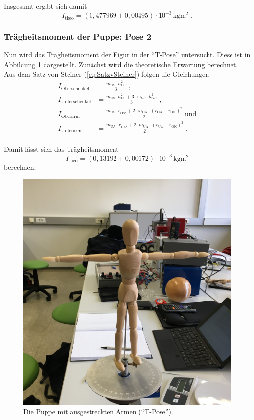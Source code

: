 Insgesamt ergibt sich damit
\begin{equation*}
  I_{\text{theo}} = (0,477969 \pm 0,00495) \cdot 10^{-3} \, \unit{\kilo\gram\meter\squared} \text{ .}
\end{equation*}

\subsubsection{Trägheitsmoment der Puppe: Pose 2}

Nun wird das Trägheitsmoment der Figur in der \enquote{T-Pose} untersucht.
Diese ist in Abbildung \ref{fig:pose2} dargestellt.
Zunächst wird die theoretische Erwartung berechnet.
Aus dem Satz von Steiner (\ref{eq:SatzvSteiner}) folgen die Gleichungen
\begin{align*}
I_{\text{Oberschenkel}} &= \frac{m_{\text{OS}} \cdot h_{\text{OS}}^2} {3} \text{ ,}\\
I_{\text{Unterschenkel}} &= \frac{m_{\text{US}} \cdot h_{\text{US}}^2 + 3 \cdot m_{US} \cdot h_{OS}^2} {3} \text{ ,}\\
I_{\text{Oberarm}} &= \frac{m_{\text{OS}} \cdot r_{\text{OS}^2} + 2 \cdot m_{\text{OA}} \cdot (r_{\text{OA}} + r_{\text{OK}})^2} {2} \text{ und}\\
I_{\text{Unterarm}} &= \frac{m_{\text{UA}} \cdot r_{\text{UA}^2} + 2 \cdot m_{\text{UA}} \cdot (r_{\text{UA}} + r_{\text{OK}})^2} {2} \text{ .}\\
\end{align*}

Damit lässt sich das Trägheitsmoment
\begin{equation*}
  I_{\text{theo}} = (0,13192 \pm 0,00672) \cdot 10^{-3} \, \unit{\kilo\gram\meter\squared}
\end{equation*}
berechnen.

\begin{figure}[H]
  \centering
  \includegraphics[width=0.3\columnwidth]{pictures/puppe_tpose.jpg}
  \caption{Die Puppe mit ausgestreckten Armen (\enquote{T-Pose}).}
  \label{fig:pose2}
\end{figure}

